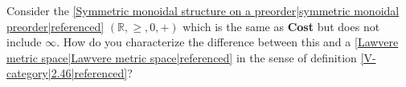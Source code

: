 
Consider the \ref{Symmetric monoidal structure on a preorder|symmetric monoidal preorder|referenced} $(\mathbb{R},\geq,0,+)$ which is the same as \textbf{Cost} but does not include $\infty$. How do you characterize the difference between this and a \ref{Lawvere metric space|Lawvere metric space|referenced} in the sense of definition \ref{V-category|2.46|referenced}?
